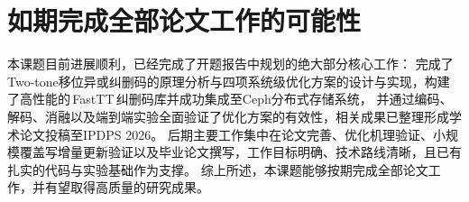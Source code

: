 \section{如期完成全部论文工作的可能性}

本课题目前进展顺利，已经完成了开题报告中规划的绝大部分核心工作：
完成了Two-tone移位异或纠删码的原理分析与四项系统级优化方案的设计与实现，构建了高性能的\,FastTT\,纠删码库并成功集成至Ceph分布式存储系统，
并通过编码、解码、消融以及端到端实验全面验证了优化方案的有效性，相关成果已整理形成学术论文投稿至IPDPS 2026。
后期主要工作集中在论文完善、优化机理验证、小规模覆盖写增量更新验证以及毕业论文撰写，工作目标明确、技术路线清晰，且已有扎实的代码与实验基础作为支撑。
综上所述，本课题能够按期完成全部论文工作，并有望取得高质量的研究成果。
